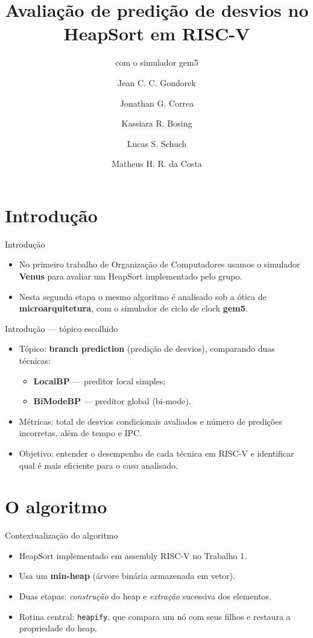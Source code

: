 \documentclass[aspectratio=169,11pt]{beamer}
\title[Predição de Desvios no HeapSort]{Avaliação de predição de desvios no HeapSort em RISC-V}
\subtitle{com o simulador gem5}
\institute[UFFS]{Organização de Computadores --- UFFS}
\author{Jean C. C. Gondorek \and Jonathan G. Correa \and Kassiara R. Bosing \and Lucas S. Schuch \and Matheus H. R. da Costa}
\date{}
\begin{document}
\maketitle

\section{Introdução}

\begin{frame}{Introdução}
  \begin{itemize}
    \item No primeiro trabalho de Organização de Computadores usamos o
          simulador \textbf{Venus} para avaliar um HeapSort implementado pelo grupo.
    \item Nesta segunda etapa o mesmo algoritmo é analisado sob a ótica de
          \textbf{microarquitetura}, com o simulador de ciclo de clock \textbf{gem5}.
  \end{itemize}
\end{frame}

\begin{frame}{Introdução --- tópico escolhido}
  \begin{itemize}
    \item Tópico: \textbf{branch prediction} (predição de desvios), comparando duas técnicas:
      \begin{itemize}
        \item \textbf{LocalBP} --- preditor local simples;
        \item \textbf{BiModeBP} --- preditor global (bi-mode).
      \end{itemize}
    \item Métricas: total de desvios condicionais avaliados e número de
          predições incorretas, além de tempo e IPC.
    \item Objetivo: entender o desempenho de cada técnica em RISC-V e
          identificar qual é mais eficiente para o caso analisado.
  \end{itemize}
\end{frame}

\section{O algoritmo}

\begin{frame}{Contextualização do algoritmo}
  \begin{itemize}
    \item HeapSort implementado em assembly RISC-V no Trabalho 1.
    \item Usa um \textbf{min-heap} (árvore binária armazenada em vetor).
    \item Duas etapas: \emph{construção} do heap e \emph{extração} sucessiva dos elementos.
    \item Rotina central: \texttt{heapify}, que compara um nó com seus filhos e
          restaura a propriedade do heap.
  \end{itemize}
\end{frame}
\end{document}
